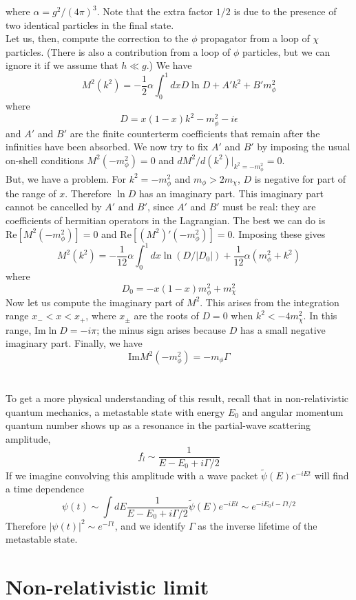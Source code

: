 \documentclass[cyan]{elegantnote}
\begin{document}
where $\alpha = g^2/(4\pi)^3$.
Note that the extra factor $1/2$ is due to the presence of two identical particles in the final state.
\\
Let us, then, compute the correction to the $\phi$ propagator from a loop of $\chi$ particles. (There is also a contribution from a loop of $\phi$ particles, but we can ignore it if we assume that $h \ll g$.) We have
\[M^2(k^2) = -\frac{1}{2}\alpha \int_0^1 dx D\ln D + A'k^2 + B'm_{\phi}^2\]
where
\[D = x(1-x)k^2 - m_{\phi}^2 - i\epsilon\]
and $A'$ and $B'$ are the finite counterterm coefficients that remain after the infinities have been absorbed. 
We now try to fix $A'$ and $B'$ by imposing the usual on-shell conditions $M^2(-m_{\phi}^2) = 0$ and $d M^2 / d(k^2)|_{k^2=-m_{\phi}^2} = 0$.
\\
But, we have a problem. For $k^2 = -m_{\phi}^2$ and $m_{\phi} > 2m_{\chi}$, $D$ is negative for part of the range of $x$. Therefore $\ln D$ has an imaginary part. 
This imaginary part cannot be cancelled by $A'$ and $B'$, since $A'$ and $B'$ must be real: they are coefficients of hermitian operators in the Lagrangian. 
The best we can do is $\mathrm{Re}[M^2(-m_{\phi}^2)] = 0$ and $\mathrm{Re}[(M^2)'(-m_{\phi}^2)] = 0$. Imposing these gives
\[M^2(k^2) = -\frac{1}{12}\alpha \int_0^1 dx \ln(D/|D_0|) + \frac{1}{12}\alpha(m_{\phi}^2 + k^2)\]
where
\[D_0 = -x(1-x)m_{\phi}^2 + m_{\chi}^2\]
Now let us compute the imaginary part of $M^2$. 
This arises from the integration range $x_- < x < x_+$, where $x_{\pm}$ are the roots of $D = 0$ when $k^2 < -4m_{\chi}^2$. 
In this range, $\mathrm{Im} \ln D = -i \pi$; the minus sign
arises because $D$ has a small negative imaginary part. Finally, we have
\[\mathrm{Im} M^2(-m_{\phi}^2) = -m_{\phi} \Gamma\]
\\ \\
To get a more physical understanding of this result, recall that in non-relativistic quantum mechanics, a metastable state with energy $E_0$ and angular momentum quantum number shows up as a resonance in the partial-wave scattering amplitude,
\[f_l \sim \frac{1}{E - E_0 + i\Gamma/2}\]
If we imagine convolving this amplitude with a wave packet $\tilde{\psi}(E)e^{-iEt}$ will find a time dependence
\[\psi(t) \sim \int dE \frac{1}{E-E_0+i\Gamma/2} \tilde{\psi}(E)e^{-iEt} \sim e^{-iE_0 t - \Gamma t /2}\]
Therefore $|\psi(t)|^2 \sim e^{-\Gamma t}$, and we identify $\Gamma$ as the inverse lifetime of the metastable state.

\section{Non-relativistic limit}
\end{document}
